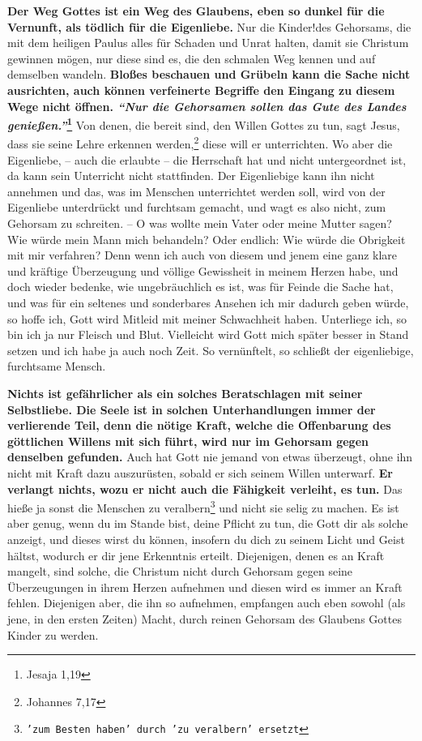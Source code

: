 \label{ref:04_22_vernunft} 
\textbf{Der Weg Gottes ist ein Weg des Glaubens, eben so dunkel für die
Vernunft,  als
tödlich für die Eigenliebe.} Nur die Kinder!des Gehorsams,
 die mit dem heiligen
Paulus alles für Schaden und Unrat halten, damit sie Christum gewinnen mögen,
nur diese sind es, die den schmalen Weg kennen und auf demselben wandeln.
\textbf{Bloßes
beschauen und Grübeln kann die Sache nicht ausrichten, auch können verfeinerte
Begriffe den Eingang zu diesem Wege nicht öffnen.
\textit{"`Nur die Gehorsamen sollen das Gute des Landes
genießen."'}\footnote{Jesaja 1,19}}
Von denen, die bereit sind,
den Willen Gottes zu tun, sagt Jesus, dass sie seine Lehre erkennen
werden,\footnote{Johannes 7,17}
diese will er unterrichten. Wo aber die Eigenliebe,
-- auch die erlaubte -- die Herrschaft hat und nicht untergeordnet ist, da kann
sein Unterricht nicht stattfinden. Der Eigenliebige kann ihn nicht annehmen und
das, was im Menschen unterrichtet werden soll, wird von der Eigenliebe
unterdrückt und furchtsam gemacht, und wagt es also nicht, zum Gehorsam zu
schreiten. -- O was wollte mein Vater oder meine Mutter sagen? Wie würde mein
Mann mich behandeln? Oder endlich: Wie würde die Obrigkeit mit mir verfahren?
Denn wenn ich auch von diesem und jenem eine ganz klare und kräftige
Überzeugung und völlige Gewissheit in meinem Herzen habe, und doch wieder
bedenke, wie ungebräuchlich es ist, was für Feinde die Sache hat, und was für
ein seltenes und sonderbares Ansehen ich mir dadurch geben würde, so hoffe ich,
Gott wird Mitleid mit meiner Schwachheit haben. Unterliege ich, so bin ich ja
nur Fleisch und Blut. Vielleicht wird Gott mich später besser in Stand
setzen und ich habe ja auch noch Zeit. So vernünftelt, so schließt der
eigenliebige, furchtsame Mensch.

\medskip

\label{ref:04_22_vernunft_und_ego}
\textbf{Nichts ist gefährlicher als ein solches Beratschlagen mit seiner
Selbstliebe.
Die Seele ist in solchen Unterhandlungen immer der verlierende Teil,
denn die
nötige Kraft, welche die Offenbarung des göttlichen Willens mit sich führt,
wird nur im Gehorsam gegen denselben gefunden.} Auch hat Gott nie jemand von
etwas überzeugt, ohne ihn nicht mit Kraft dazu auszurüsten, sobald er sich
seinem Willen unterwarf. \textbf{Er verlangt nichts, wozu er nicht auch die
Fähigkeit
verleiht, es tun.} Das hieße ja sonst die Menschen zu
veralbern\footnote{\texttt{'zum Besten haben' durch 'zu veralbern' ersetzt}} und
nicht sie
selig zu machen. Es ist aber genug, wenn du im Stande bist, deine Pflicht zu
tun, die Gott dir als solche anzeigt, und dieses wirst du können, insofern du
dich zu seinem Licht und Geist hältst, wodurch er dir jene Erkenntnis
erteilt. Diejenigen, denen es an Kraft mangelt, sind solche, die Christum nicht
durch Gehorsam gegen seine Überzeugungen in ihrem Herzen aufnehmen und diesen
wird es immer an Kraft fehlen. Diejenigen aber, die ihn so aufnehmen, empfangen
auch eben sowohl (als jene, in den ersten Zeiten) Macht, durch reinen Gehorsam
des Glaubens Gottes Kinder zu werden.

